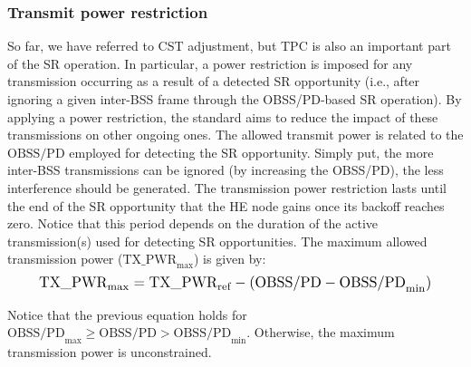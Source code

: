 \documentclass[comsoc]{IEEEtran}
\begin{document}
	\subsubsection{Transmit power restriction}	\label{section:tx_power_restriction}
	So far, we have referred to CST adjustment, but TPC is also an important part of the SR operation. In particular, a power restriction is imposed for any transmission occurring as a result of a detected SR opportunity (i.e., after ignoring a given inter-BSS frame through the OBSS/PD-based SR operation). By applying a power restriction, the standard aims to reduce the impact of these transmissions on other ongoing ones. The allowed transmit power is related to the $\text{OBSS/PD}$ employed for detecting the SR opportunity. Simply put, the more inter-BSS transmissions can be ignored (by increasing the OBSS/PD), the less interference should be generated. The transmission power restriction lasts until the end of the SR opportunity that the HE node gains once its backoff reaches zero. Notice that this period depends on the duration of the active transmission(s) used for detecting SR opportunities. The maximum allowed transmission power ($\text{TX\_PWR}_{\max}$) is given by:
	\begin{equation}
	\resizebox{.9\columnwidth}{!}{$\text{TX\_PWR}_{\max} = \text{TX\_PWR}_{\text{ref}} - (\text{OBSS/PD} -\text{OBSS/PD}_{\min})$}
	\label{eq:power_restriction}
	\end{equation}
	
	Notice that the previous equation holds for $\text{OBSS/PD}_{\max} \geq \text{OBSS/PD} > \text{OBSS/PD}_{\min}$. Otherwise, the maximum transmission power is unconstrained.
	
\end{document}
